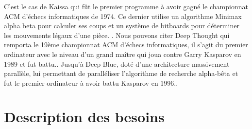 \documentclass{article}
\begin{document}
\newline
C'est le cas de Kaissa qui fût le premier programme à avoir gagné le championnat ACM d'échecs informatiques de 1974. Ce dernier utilise un algorithme Minimax alpha beta \cite{KaissaAB} pour calculer ses coups et un système de bitboards pour déterminer les mouvements légaux d'une pièce. \cite{KaissaBitboard}.
\newline
Nous pouvons citer Deep Thought qui remporta le 19ème championnat ACM d'échecs informatiques, il s'agit du premier ordinateur avec le niveau d'un grand maître qui joua contre Garry Kasparov en 1989 et fut battu.\cite{Deep}. 
\newline
Jusqu'à Deep Blue, doté d'une architecture massivement parallèle, lui permettant de paralléliser l'algorithme de recherche alpha-bêta\cite{DeepSystem} et fut le premier ordinateur à avoir battu Kasparov en 1996.\cite{Deep}.
\newpage
\section{Description des besoins}

\end{document}
